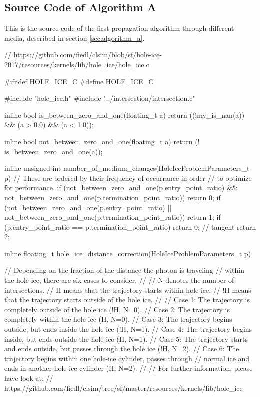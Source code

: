 
\subsection{Source Code of Algorithm A}
\label{sec:algorithm_a_source}

This is the source code of the first propagation algorithm through different media, described in section \ref{sec:algorithm_a}.


\begin{ccode}
// https://github.com/fiedl/clsim/blob/sf/hole-ice-2017/resources/kernels/lib/hole_ice/hole_ice.c

#ifndef HOLE_ICE_C
#define HOLE_ICE_C

#include "hole_ice.h"
#include "../intersection/intersection.c"

inline bool is_between_zero_and_one(floating_t a) {
  return ((!my_is_nan(a)) && (a > 0.0) && (a < 1.0));
}

inline bool not_between_zero_and_one(floating_t a) {
  return (! is_between_zero_and_one(a));
}

inline unsigned int number_of_medium_changes(HoleIceProblemParameters_t p)
{
  // These are ordered by their frequency of occurrance in order
  // to optimize for performance.
  if (not_between_zero_and_one(p.entry_point_ratio) && not_between_zero_and_one(p.termination_point_ratio)) return 0;
  if (not_between_zero_and_one(p.entry_point_ratio) || not_between_zero_and_one(p.termination_point_ratio)) return 1;
  if (p.entry_point_ratio == p.termination_point_ratio) return 0; // tangent
  return 2;
}

inline floating_t hole_ice_distance_correction(HoleIceProblemParameters_t p)
{
  // Depending on the fraction of the distance the photon is traveling
  // within the hole ice, there are six cases to consider.
  //
  // N  denotes the number of intersections.
  // H  means that the trajectory starts within hole ice.
  // !H means that the trajectory starts outside of the hole ice.
  //
  // Case 1: The trajectory is completely outside of the hole ice (!H, N=0).
  // Case 2: The trajectory is completely within the hole ice (H, N=0).
  // Case 3: The trajectory begins outside, but ends inside the hole ice (!H, N=1).
  // Case 4: The trajectory begins inside, but ends outside the hole ice (H, N=1).
  // Case 5: The trajectory starts and ends outside, but passes through the hole ice (!H, N=2).
  // Case 6: The trajectory begins within one hole-ice cylinder, passes through
  //           normal ice and ends in another hole-ice cylinder (H, N=2).
  //
  // For further information, please have look at:
  // https://github.com/fiedl/clsim/tree/sf/master/resources/kernels/lib/hole_ice

}
\end{ccode}

